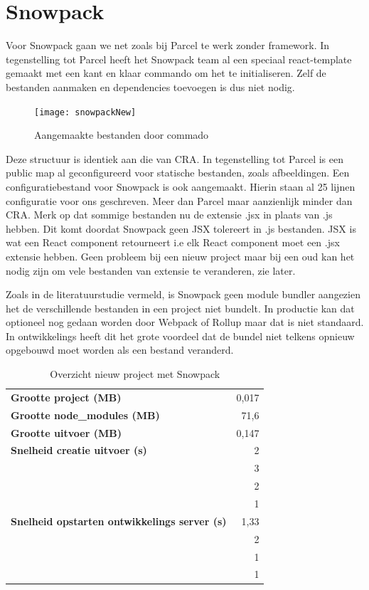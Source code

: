 \section{Snowpack}
Voor Snowpack gaan we net zoals bij Parcel te werk zonder framework. In tegenstelling tot Parcel heeft het Snowpack team al een speciaal react-template gemaakt met een kant en klaar commando om het te initialiseren. Zelf de bestanden aanmaken en dependencies toevoegen is dus niet nodig.


\begin{figure}[h]
   \texttt{[image: snowpackNew]}
       \centering
       \caption[Aangemaakte bestanden door Snowpack commando]{Aangemaakte bestanden door commado}
   \end{figure}

Deze structuur is identiek aan die van CRA. In tegenstelling tot Parcel is een public map al geconfigureerd voor statische bestanden, zoals afbeeldingen. Een configuratiebestand voor Snowpack is ook aangemaakt. Hierin staan al 25 lijnen configuratie voor ons geschreven. Meer dan Parcel maar aanzienlijk minder dan CRA. Merk op dat sommige bestanden nu de extensie .jsx in plaats van .js hebben. Dit komt doordat Snowpack geen JSX tolereert in .js bestanden. JSX is wat een React component retourneert i.e elk React component moet een .jsx extensie hebben. Geen probleem bij een nieuw project maar bij een oud kan het nodig zijn om vele bestanden van extensie te veranderen, zie later.

Zoals in de literatuurstudie vermeld, is Snowpack geen module bundler aangezien het de verschillende bestanden in een project niet bundelt. In productie kan dat optioneel nog gedaan worden door Webpack of Rollup maar dat is niet standaard. In ontwikkelings heeft dit het grote voordeel dat de bundel niet telkens opnieuw opgebouwd moet worden als een bestand veranderd.

\begin{table}[h]
   \centering
   \begin{tabular}{lr}
   \textbf{Grootte project (MB)} & 0,017 \\
   \textbf{Grootte node\_modules (MB)} & 71,6 \\
   \textbf{Grootte uitvoer (MB)} & 0,147 \\
   \textbf{Snelheid creatie uitvoer (s)} & 2 \\
   \textbf{} & 3 \\
   \textbf{} & 2 \\
   \textbf{} & 1 \\
   \textbf{Snelheid opstarten ontwikkelings server (s)} & 1,33 \\
   \textbf{} & 2 \\
   \textbf{} & 1 \\
   \textbf{} & 1
   \end{tabular}
   \caption{Overzicht nieuw project met Snowpack}
   \end{table}

